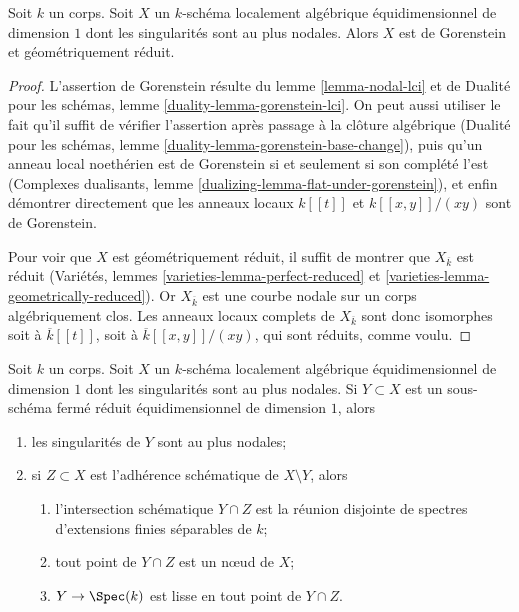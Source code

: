\begin{lemma}
\label{lemma-facts-about-nodal-curves}
Soit $k$ un corps. Soit $X$ un $k$-schéma localement algébrique équidimensionnel de dimension $1$ dont les singularités sont au plus nodales. Alors $X$ est de Gorenstein et géométriquement réduit.
\end{lemma}

\begin{proof}
L'assertion de Gorenstein résulte du lemme \ref{lemma-nodal-lci} et de Dualité pour les schémas, lemme \ref{duality-lemma-gorenstein-lci}. On peut aussi utiliser le fait qu'il suffit de vérifier l'assertion après passage à la clôture algébrique (Dualité pour les schémas, lemme \ref{duality-lemma-gorenstein-base-change}), puis qu'un anneau local noethérien est de Gorenstein si et seulement si son complété l'est (Complexes dualisants, lemme \ref{dualizing-lemma-flat-under-gorenstein}), et enfin démontrer directement que les anneaux locaux $k[[t]]$ et $k[[x, y]]/(xy)$ sont de Gorenstein.

\medskip\noindent
Pour voir que $X$ est géométriquement réduit, il suffit de montrer que $X_{\overline{k}}$ est réduit (Variétés, lemmes \ref{varieties-lemma-perfect-reduced} et \ref{varieties-lemma-geometrically-reduced}). Or $X_{\overline{k}}$ est une courbe nodale sur un corps algébriquement clos. Les anneaux locaux complets de $X_{\overline{k}}$ sont donc isomorphes soit à $\overline{k}[[t]]$, soit à $\overline{k}[[x, y]]/(xy)$, qui sont réduits, comme voulu.
\end{proof}

\begin{lemma}
\label{lemma-closed-subscheme-nodal-curve}
Soit $k$ un corps. Soit $X$ un $k$-schéma localement algébrique équidimensionnel de dimension $1$ dont les singularités sont au plus nodales. Si $Y \subset X$ est un sous-schéma fermé réduit équidimensionnel de dimension $1$, alors \begin{enumerate} \item les singularités de $Y$ sont au plus nodales; \item si $Z \subset X$ est l'adhérence schématique de $X \setminus Y$, alors \begin{enumerate} \item l'intersection schématique $Y \cap Z$ est la réunion disjointe de spectres d'extensions finies séparables de $k$; \item tout point de $Y \cap Z$ est un nœud de $X$; \item $Y \to \Spec(k)$ est lisse en tout point de $Y \cap Z$.
\end{enumerate}
\end{enumerate}
\end{lemma}

